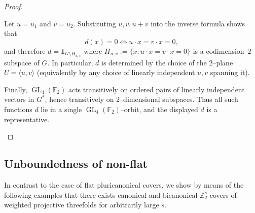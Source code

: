 \documentclass[12pt,twoside,]{amsart}
\theoremstyle{plain}
\theoremstyle{definition}
\begin{document}
\begin{proof}
\begin{enumerate}
Let $u=u_1$ and $v=u_2$. Substituting $u,v,u+v$ into the inverse formula shows
that
\[
d(x)=0 \iff u\cdot x=v\cdot x=0,
\]
and therefore $d=\mathbf 1_{G\setminus H_{u,v}}$ where
$H_{u,v}:=\{x: u\cdot x=v\cdot x=0\}$ is a codimension--$2$ subspace of $G$.
In particular, $d$ is determined by the choice of the $2$--plane
$U=\langle u,v\rangle$ (equivalently by any choice of linearly independent
$u,v$ spanning it).

Finally, $\operatorname{GL}_4(\mathbb F_2)$ acts transitively on ordered pairs of
linearly independent vectors in $G^*$, hence transitively on $2$--dimensional
subspaces. Thus all such functions $d$ lie in a single
$\operatorname{GL}_4(\mathbb F_2)$--orbit, and the displayed $d$ is a
representative.
\end{enumerate}
\end{proof}


\subsection{Unboundedness of non-flat}

In contrast to the case of flat pluricanonical covers, we show by means of the following examples that there exists canonical and bicanonical $\mathbb{Z}_2^s$ covers of weighted projective threefolds for arbitrarily large $s$.
\end{document}
